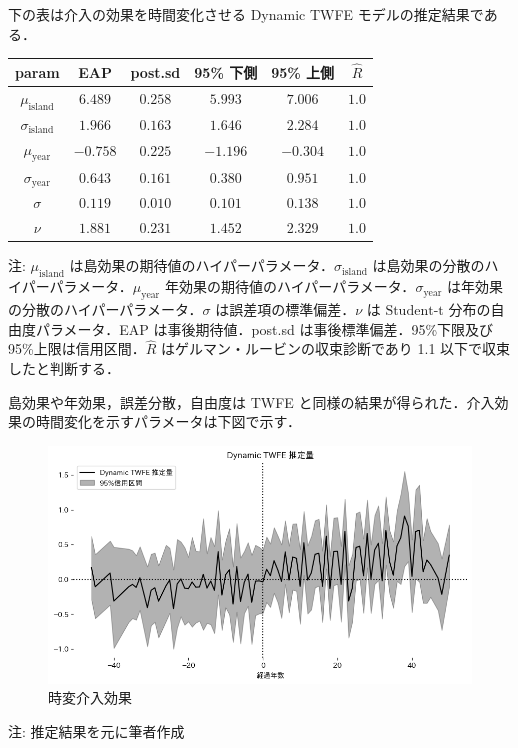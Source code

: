下の表は介入の効果を時間変化させる Dynamic TWFE モデルの推定結果である．

\begin{longtable}[]{@{}cccccc@{}}
\toprule
param & EAP & post.sd & 95\% 下側 & 95\% 上側 &
\(\hat{R}\)\tabularnewline
\midrule
\endhead
\(\mu_{\text{island}}\) & \(6.489\) & \(0.258\) & \(5.993\) & \(7.006\)
& \(1.0\)\tabularnewline
\(\sigma_{\text{island}}\) & \(1.966\) & \(0.163\) & \(1.646\) &
\(2.284\) & \(1.0\)\tabularnewline
\(\mu_{\text{year}}\) & \(-0.758\) & \(0.225\) & \(-1.196\) & \(-0.304\)
& \(1.0\)\tabularnewline
\(\sigma_{\text{year}}\) & \(0.643\) & \(0.161\) & \(0.380\) & \(0.951\)
& \(1.0\)\tabularnewline
\(\sigma\) & \(0.119\) & \(0.010\) & \(0.101\) & \(0.138\) &
\(1.0\)\tabularnewline
\(\nu\) & \(1.881\) & \(0.231\) & \(1.452\) & \(2.329\) &
\(1.0\)\tabularnewline
\bottomrule
\end{longtable}

注: \(\mu_{\text{island}}\)
は島効果の期待値のハイパーパラメータ．\(\sigma_{\text{island}}\)
は島効果の分散のハイパーパラメータ．\(\mu_{\text{year}}\)
年効果の期待値のハイパーパラメータ．\(\sigma_{\text{year}}\)
は年効果の分散のハイパーパラメータ．\(\sigma\)
は誤差項の標準偏差．\(\nu\) は \(\text{Student-t}\)
分布の自由度パラメータ．EAP は事後期待値．post.sd
は事後標準偏差．95\%下限及び 95\%上限は信用区間．\(\hat{R}\)
はゲルマン・ルービンの収束診断であり 1.1 以下で収束したと判断する．

島効果や年効果，誤差分散，自由度は TWFE
と同様の結果が得られた．介入効果の時間変化を示すパラメータは下図で示す．

\begin{figure}
\centering
\includegraphics{../figures/dynamic_twfe/ATT.png}
\caption{時変介入効果}
\end{figure}

注: 推定結果を元に筆者作成

